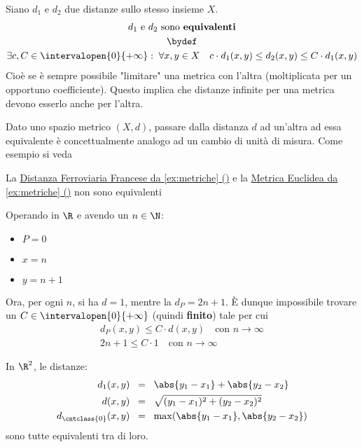 \begin{definition}
	\label{def:metr_equiv}
	Siano $d_1$ e $d_2$ due distanze sullo stesso insieme $X$.
	\begin{gather*}
		d_1 \text{ e } d_2 \text{ sono \textbf{equivalenti}}\\
		\bydef\\
		\exists c,C \in \intervalopen{0}{+\infty}:\; \forall x,y \in X \quad c \cdot d_1(x,y) \leq d_2 (x,y) \leq C \cdot d_1 (x,y)
	\end{gather*}
	Cioè se è sempre possibile "limitare" una metrica con l'altra (moltiplicata per un opportuno coefficiente). Questo implica che distanze infinite per una metrica devono esserlo anche per l'altra.
	\begin{note}
		Dato uno spazio metrico $(X,d)$, passare dalla distanza $d$ ad un'altra ad essa equivalente è concettualmente analogo ad un cambio di unità di misura. Come esempio si veda 
	\end{note}
\end{definition}
\begin{example}
	La \hyperref[ex:dist_parigi]{Distanza Ferroviaria Francese da \cref*{ex:metriche} ()} e la \hyperref[ex:dist_eucl]{Metrica Euclidea da \cref*{ex:metriche} ()} non sono equivalenti
	\begin{solution}
		Operando in $\R$ e avendo un $n \in \N$:
		\begin{itemize}[noitemsep]
			\item $P = 0$
			\item $x = n$
			\item $y = n+1$
		\end{itemize}
		Ora, per ogni $n$, si ha $d = 1$, mentre la $d_P = 2n+1$. È dunque impossibile trovare un $C \in \intervalopen{0}{+\infty}$ (quindi \textbf{finito}) tale per cui
		\begin{gather*}
			d_P(x,y) \leq C \cdot d(x,y) \quad \text{con } n \to \infty\\
			2n+1 \leq C \cdot 1 \quad \text{con } n \to \infty
		\end{gather*}
	\end{solution}
\end{example}
\begin{example}
	\label{ex:metr_equiv_R2}
	In $\R^2$, le distanze:
	\begin{align*}
		d_1(x,y) \;\; &= \;\; \abs{y_1 - x_1} + \abs{y_2 - x_2}\\
		d(x,y) \;\; &= \;\; \sqrt{(y_1 - x_1)^2 + (y_2 - x_2)^2}\\
		d_{\cntclass{0}}(x,y) \;\; &= \;\; \max (\abs{y_1 - x_1}, \abs{y_2 - x_2})
	\end{align*}
	sono tutte equivalenti tra di loro.
\end{example}

